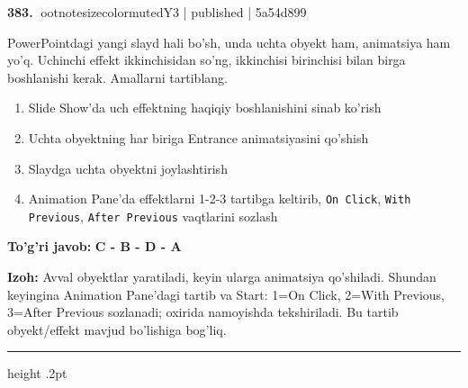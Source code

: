\documentclass[10pt,a4paper]{article}
\begin{document}
\textbf{\color{ink}383.} {ootnotesizecolor{muted}Y3 | published | 5a54d899}
\par
PowerPointdagi yangi slayd hali bo'sh, unda uchta obyekt ham, animatsiya ham yo'q. Uchinchi effekt ikkinchisidan so'ng, ikkinchisi birinchisi bilan birga boshlanishi kerak. Amallarni tartiblang.
\begin{enumerate}[label=\Alph*),leftmargin=9mm]
\item Slide Show'da uch effektning haqiqiy boshlanishini sinab ko'rish
\item Uchta obyektning har biriga Entrance animatsiyasini qo'shish
\item Slaydga uchta obyektni joylashtirish
\item Animation Pane'da effektlarni 1-2-3 tartibga keltirib, \texttt{On Click}, \texttt{With Previous}, \texttt{After Previous} vaqtlarini sozlash
\end{enumerate}
\begin{tcolorbox}[enhanced,breakable,colback=teal!4,colframe=teal!55!black,boxrule=0.45pt,arc=1.2mm,left=2.8mm,right=2.8mm,top=2mm,bottom=2mm]
\textbf{\color{teal}To'g'ri javob:} \textbf{C - B - D - A}
\par\smallskip
\textbf{Izoh:} Avval obyektlar yaratiladi, keyin ularga animatsiya qo'shiladi. Shundan keyingina Animation Pane'dagi tartib va Start: 1=On Click, 2=With Previous, 3=After Previous sozlanadi; oxirida namoyishda tekshiriladi. Bu tartib obyekt/effekt mavjud bo'lishiga bog'liq.
\end{tcolorbox}
\vspace{2mm}\hrule height .2pt\vspace{2mm}
\end{document}
